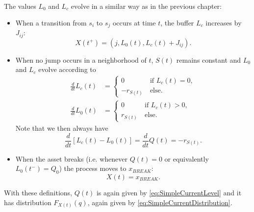 \documentclass[a4paper]{thesis}
\theoremstyle{definition}
\begin{document}
The values $L_0$ and $L_c$ evolve in a similar way as in the previous chapter:
\begin{itemize}
	\item When a transition from $s_i$ to $s_j$ occurs at time $t$, the buffer $L_c$ increases by $J_{ij}$:
	\begin{equation}\label{eq:MmfmJumpEvolution}
	X(t^+)=(j,L_0(t),L_c(t)+J_{ij}).
	\end{equation}
	\item When no jump occurs in a neighborhood of $t$, $S(t)$ remains constant and $L_0$ and $L_c$ evolve according to
	\begin{equation}\label{eq:MmfmAgeEvolution}
	\begin{split}
	\frac{d}{dt}L_c(t)&=\begin{cases}
	0&\ \text{if }L_c(t)=0,\\
	-r_{S(t)}&\ \text{else.}
	\end{cases}\\
	\frac{d}{dt}L_0(t)&=\begin{cases}
	0&\ \text{if }L_c(t)>0,\\
	r_{S(t)}&\ \text{else.}
	\end{cases}
	\end{split}
	\end{equation}
	Note that we then always have
	\[
	\frac{d}{dt}\left[L_c(t)-L_0(t)\right]=\frac{d}{dt}Q(t)=-r_{S(t)}.
	\]
	\item When the asset breaks (i.e. whenever $Q(t)=0$ or equivalently $L_0(t^-)=Q_0$) the process moves to $x_{BREAK}$:
	\[
	X(t)=x_{BREAK}.
	\]
\end{itemize}
With these definitions, $Q(t)$ is again given by \eqref{eq:SimpleCurrentLevel} and it has distribution $F_{X(t)}(q)$,  again given by \eqref{eq:SimpleCurrentDistribution}.
\end{document}
